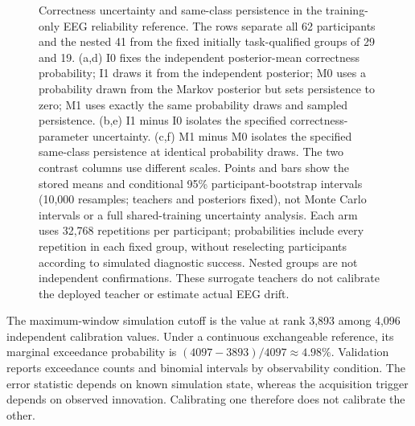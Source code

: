 \documentclass[11pt,a4paper]{article}
\begin{document}
\begin{figure}[p]
\caption{Correctness uncertainty and same-class persistence in the training-only EEG reliability reference. The rows separate all 62 participants and the nested 41 from the fixed initially task-qualified groups of 29 and 19. (a,d) I0 fixes the independent posterior-mean correctness probability; I1 draws it from the independent posterior; M0 uses a probability drawn from the Markov posterior but sets persistence to zero; M1 uses exactly the same probability draws and sampled persistence. (b,e) I1 minus I0 isolates the specified correctness-parameter uncertainty. (c,f) M1 minus M0 isolates the specified same-class persistence at identical probability draws. The two contrast columns use different scales. Points and bars show the stored means and conditional 95\% participant-bootstrap intervals (10,000 resamples; teachers and posteriors fixed), not Monte Carlo intervals or a full shared-training uncertainty analysis. Each arm uses 32,768 repetitions per participant; probabilities include every repetition in each fixed group, without reselecting participants according to simulated diagnostic success. Nested groups are not independent confirmations. These surrogate teachers do not calibrate the deployed teacher or estimate actual EEG drift.}
\label{fig:dynamics-reliability-reference}
\end{figure}

The maximum-window simulation cutoff is the value at rank 3,893 among 4,096 independent calibration values. Under a continuous exchangeable reference, its marginal exceedance probability is $(4097-3893)/4097\approx4.98\%$. Validation reports exceedance counts and binomial intervals by observability condition. The error statistic depends on known simulation state, whereas the acquisition trigger depends on observed innovation. Calibrating one therefore does not calibrate the other.
\end{document}

